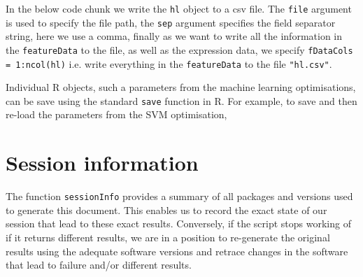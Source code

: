 In the below code chunk we write the \texttt{hl} object to a csv
file. The \texttt{file} argument is used to specify the file path, the
\texttt{sep} argument specifies the field separator string, here we
use a comma, finally as we want to write all the information in the
\texttt{featureData} to the file, as well as the expression data, we
specify \texttt{fDataCols = 1:ncol(hl)} i.e. write everything in the
\texttt{featureData} to the file \texttt{"hl.csv"}.

\begin{knitrout}
\color{fgcolor}\begin{kframe}
\begin{alltt}
  \hlstd{=} \hlstd{,}  \hlstd{=} \hlstd{,}
             \hlstd{=} \hlopt{:}
\end{alltt}
\end{kframe}
\end{knitrout}

Individual R objects, such a parameters from the machine learning
optimisations, can be save using the standard \texttt{save} function
in R.  For example, to save and then re-load the parameters from the
SVM optimisation,

\begin{knitrout}
\color{fgcolor}\begin{kframe}
\begin{alltt}
  \hlstd{=} \hlstd{)}

\hlstd{(} \hlstd{=} \hlstd{)}
\end{alltt}
\end{kframe}
\end{knitrout}

\section*{Session information}

The function \texttt{sessionInfo} provides a summary of all packages
and versions used to generate this document. This enables us to record
the exact state of our session that lead to these exact
results. Conversely, if the script stops working of if it returns
different results, we are in a position to re-generate the original
results using the adequate software versions and retrace changes in
the software that lead to failure and/or different results.

